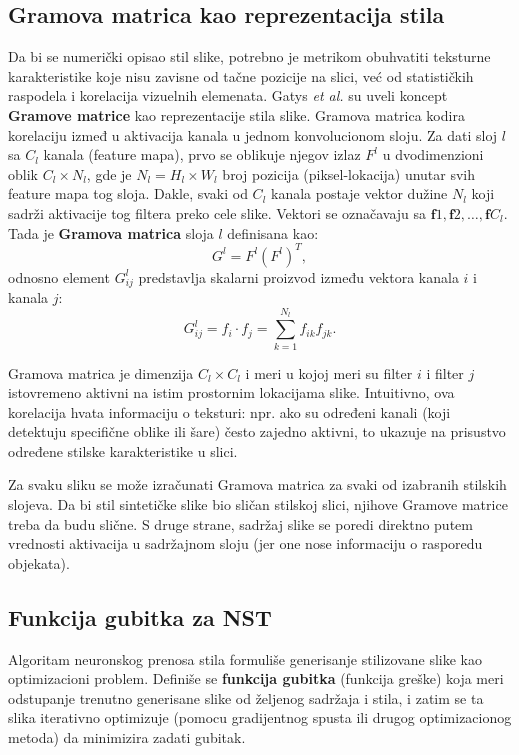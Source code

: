 \documentclass[a4paper,12pt]{article}
\begin{document}
\subsection{Gramova matrica kao reprezentacija stila}
Da bi se numerički opisao stil slike, potrebno je metrikom obuhvatiti teksturne karakteristike koje nisu zavisne od tačne pozicije na slici, već od statističkih raspodela i korelacija vizuelnih elemenata. Gatys \emph{et al.} su uveli koncept \textbf{Gramove matrice} kao reprezentacije stila slike. Gramova matrica kodira korelaciju izmeđ u aktivacija kanala u jednom konvolucionom sloju. Za dati sloj $l$ sa $C_l$ kanala (feature mapa), prvo se oblikuje njegov izlaz $F^l$ u dvodimenzioni oblik $C_l \times N_l$, gde je $N_l = H_l \times W_l$ broj pozicija (piksel-lokacija) unutar svih feature mapa tog sloja. Dakle, svaki od $C_l$ kanala postaje vektor dužine $N_l$ koji sadrži aktivacije tog filtera preko cele slike. Vektori se označavaju sa $\mathbf{f}1, \mathbf{f}2, \dots, \mathbf{f}{C_l}$. Tada je \textbf{Gramova matrica} sloja $l$ definisana kao:
\[
G^l = F^l (F^l)^{T},
\]
odnosno element $G^l_{ij}$ predstavlja skalarni proizvod između vektora kanala $i$ i kanala $j$:
\[
G^l_{ij} = f_i \cdot f_j = \sum_{k=1}^{N_l} f_{ik} f_{jk}.
\]

Gramova matrica je dimenzija $C_l \times C_l$ i meri u kojoj meri su filter $i$ i filter $j$ istovremeno aktivni na istim prostornim lokacijama slike. Intuitivno, ova korelacija hvata informaciju o teksturi: npr. ako su određeni kanali (koji detektuju specifične oblike ili šare) često zajedno aktivni, to ukazuje na prisustvo određene stilske karakteristike u slici.

Za svaku sliku se može izračunati Gramova matrica za svaki od izabranih stilskih slojeva. Da bi stil sintetičke slike bio sličan stilskoj slici, njihove Gramove matrice treba da budu slične. S druge strane, sadržaj slike se poredi direktno putem vrednosti aktivacija u sadržajnom sloju (jer one nose informaciju o rasporedu objekata). 

\subsection{Funkcija gubitka za NST}
Algoritam neuronskog prenosa stila formuliše generisanje stilizovane slike kao optimizacioni problem. Definiše se \textbf{funkcija gubitka} (funkcija greške) koja meri odstupanje trenutno generisane slike od željenog sadržaja i stila, i zatim se ta slika iterativno optimizuje (pomocu gradijentnog spusta ili drugog optimizacionog metoda) da minimizira zadati gubitak.
\end{document}
